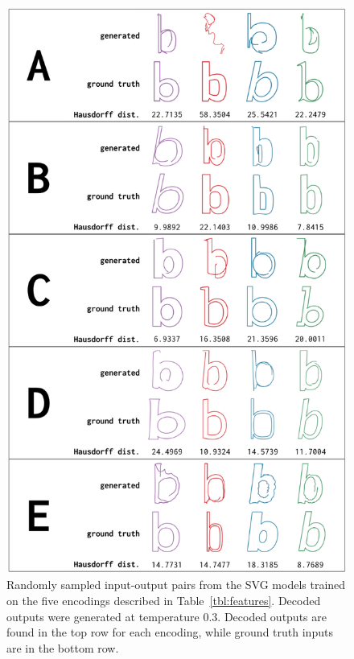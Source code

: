 \begin{figure}[t]
    \centering
	\includegraphics[height=0.8\textheight]{figures/encodings}
    \caption[Visual results of training the SVG model with different encodings]{Randomly sampled input-output pairs from the SVG models trained on the five encodings described in Table~\ref{tbl:features}.
    Decoded outputs were generated at temperature 0.3.
    Decoded outputs are found in the top row for each encoding, while ground truth inputs are in the bottom row.\label{fig:encodings}}
\end{figure}
